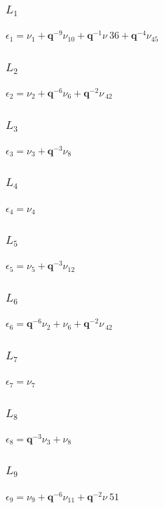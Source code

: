 \subsubsection*{$L_{1}$}
$
\epsilon_{1} = \nu_{1} + \boldsymbol{q}^{-9}\nu_{10} + \boldsymbol{q}^{-1}\nu_\
{36} + \boldsymbol{q}^{-4}\nu_{45}
$

\subsubsection*{$L_{2}$}
$
\epsilon_{2} = \nu_{2} + \boldsymbol{q}^{-6}\nu_{6} + \boldsymbol{q}^{-2}\nu_{\
42}
$

\subsubsection*{$L_{3}$}
$
\epsilon_{3} = \nu_{3} + \boldsymbol{q}^{-3}\nu_{8}
$

\subsubsection*{$L_{4}$}
$
\epsilon_{4} = \nu_{4}
$

\subsubsection*{$L_{5}$}
$
\epsilon_{5} = \nu_{5} + \boldsymbol{q}^{-3}\nu_{12}
$

\subsubsection*{$L_{6}$}
$
\epsilon_{6} = \boldsymbol{q}^{-6}\nu_{2} + \nu_{6} + \boldsymbol{q}^{-2}\nu_{\
42}
$

\subsubsection*{$L_{7}$}
$
\epsilon_{7} = \nu_{7}
$

\subsubsection*{$L_{8}$}
$
\epsilon_{8} = \boldsymbol{q}^{-3}\nu_{3} + \nu_{8}
$

\subsubsection*{$L_{9}$}
$
\epsilon_{9} = \nu_{9} + \boldsymbol{q}^{-6}\nu_{11} + \boldsymbol{q}^{-2}\nu_\
{51}
$

